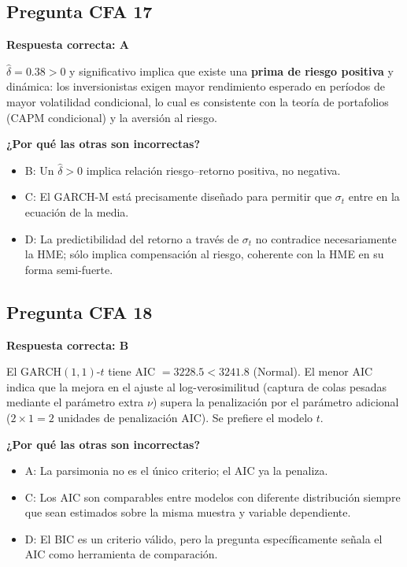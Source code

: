 \documentclass[12pt,a4paper]{article}
\begin{document}
\subsection*{Pregunta CFA 17}

\begin{respuestacfa}
\textbf{Respuesta correcta: A}

$\hat{\delta}=0.38>0$ y significativo implica que existe una \textbf{prima de riesgo positiva} y dinámica: los inversionistas exigen mayor rendimiento esperado en períodos de mayor volatilidad condicional, lo cual es consistente con la teoría de portafolios (CAPM condicional) y la aversión al riesgo.

\textbf{¿Por qué las otras son incorrectas?}
\begin{itemize}[noitemsep]
  \item B: Un $\hat{\delta}>0$ implica relación riesgo–retorno positiva, no negativa.
  \item C: El GARCH-M está precisamente diseñado para permitir que $\sigma_t$ entre en la ecuación de la media.
  \item D: La predictibilidad del retorno a través de $\sigma_t$ no contradice necesariamente la HME; sólo implica compensación al riesgo, coherente con la HME en su forma semi-fuerte.
\end{itemize}
\end{respuestacfa}

\subsection*{Pregunta CFA 18}

\begin{respuestacfa}
\textbf{Respuesta correcta: B}

El GARCH$(1,1)$-$t$ tiene AIC $=3228.5<3241.8$ (Normal). El menor AIC indica que la mejora en el ajuste al log-verosimilitud (captura de colas pesadas mediante el parámetro extra $\nu$) supera la penalización por el parámetro adicional ($2\times1=2$ unidades de penalización AIC). Se prefiere el modelo $t$.

\textbf{¿Por qué las otras son incorrectas?}
\begin{itemize}[noitemsep]
  \item A: La parsimonia no es el único criterio; el AIC ya la penaliza.
  \item C: Los AIC son comparables entre modelos con diferente distribución siempre que sean estimados sobre la misma muestra y variable dependiente.
  \item D: El BIC es un criterio válido, pero la pregunta específicamente señala el AIC como herramienta de comparación.
\end{itemize}
\end{respuestacfa}
\end{document}
